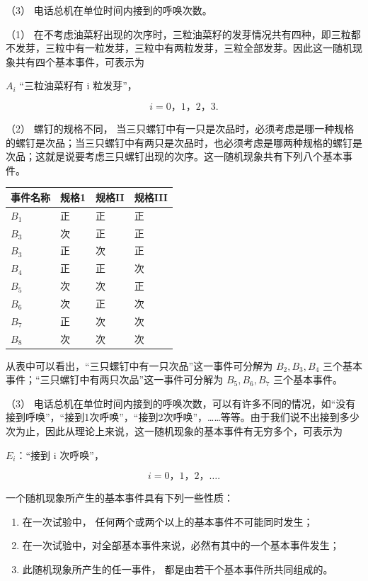 （3） 电话总机在单位时间内接到的呼唤次数。

 （1）
在不考虑油菜籽出现的次序时，三粒油菜籽的发芽情况共有四种，即三粒都不发芽，三粒中有一粒发芽，三粒中有两粒发芽，三粒全部发芽。因此这一随机现象共有四个基本事件，可表示为

\(A_{i}\) ``三粒油菜籽有 i 粒发芽''，

\[
i = 0\text{，} 1\text{，} 2\text{，} 3.
\]

（2） 螺钉的规格不同，
当三只螺钉中有一只是次品时，必须考虑是哪一种规格的螺钉是次品；当三只螺钉中有两只是次品时，也必须考虑是哪两种规格的螺钉是次品；这就是说要考虑三只螺钉出现的次序。这一随机现象共有下列八个基本事件。

{\def\LTcaptype{none} %
\begin{longtable}[]{@{}llll@{}}
\toprule\noalign{}
事件名称 & 规格1 & 规格II & 规格III \\
\midrule\noalign{}
\endhead
\bottomrule\noalign{}
\endlastfoot
\(B_1\) & 正 & 正 & 正 \\
\(B_3\) & 次 & 正 & 正 \\
\(B_3\) & 正 & 次 & 正 \\
\(B_4\) & 正 & 正 & 次 \\
\(B_5\) & 次 & 次 & 正 \\
\(B_6\) & 次 & 正 & 次 \\
\(B_7\) & 正 & 次 & 次 \\
\(B_8\) & 次 & 次 & 次 \\
\end{longtable}
}

从表中可以看出，``三只螺钉中有一只次品''这一事件可分解为 \(B_2,B_3,B_4\)
三个基本事件；``三只螺钉中有两只次品''这一事件可分解为
\(B_{5}, B_{6}, B_{7}\) 三个基本事件。

（3）
电话总机在单位时间内接到的呼唤次数，可以有许多不同的情况，如``没有接到呼唤''，``接到1次呼唤''，``接到2次呼唤''，\ldots\ldots 等等。由于我们说不出接到多少次为止，因此从理论上来说，这一随机现象的基本事件有无穷多个，可表示为

\(E_{i}\)：``接到 i 次呼唤''，

\[
i = 0\text{，} 1\text{，} 2\text{，} \dots .
\]

一个随机现象所产生的基本事件具有下列一些性质：

\begin{enumerate}
\item
  在一次试验中， 任何两个或两个以上的基本事件不可能同时发生；
\item
  在一次试验中，对全部基本事件来说，必然有其中的一个基本事件发生；
\item
  此随机现象所产生的任一事件， 都是由若干个基本事件所共同组成的。
\end{enumerate}

